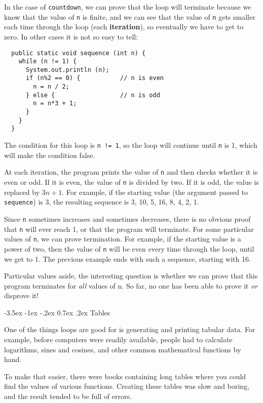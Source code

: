 \documentclass{book}
\makeatletter
\renewcommand{\section}{\@startsection 
    {section} {1} {0mm}%
    {-3.5ex \@plus -1ex \@minus -.2ex}%
    {0.7ex \@plus.2ex}%
    {\normalfont\Large\bfseries}}
\makeatother
\begin{document}
In the case of {\tt countdown}, we can prove that the loop
will terminate because we know that the value of {\tt n} is
finite, and we can see that the value of {\tt n} gets smaller
each time through the loop (each {\bf iteration}), so
eventually we have to get to zero.  In other cases it is not
so easy to tell:

\begin{verbatim}
  public static void sequence (int n) {
    while (n != 1) {
      System.out.println (n);
      if (n%2 == 0) {           // n is even
        n = n / 2;
      } else {                  // n is odd
        n = n*3 + 1;
      }
    }
  }
\end{verbatim}
%
The condition for this loop is {\tt n != 1}, so the loop
will continue until {\tt n} is 1, which will make the condition
false.

At each iteration, the program prints the value of {\tt n} and then
checks whether it is even or odd.  If it is even, the value of
{\tt n} is divided by two.  If it is odd, the value is replaced
by $3n+1$.  For example, if the starting value (the argument passed
to {\tt sequence}) is 3, the resulting sequence is
3, 10, 5, 16, 8, 4, 2, 1.

Since {\tt n} sometimes increases and sometimes decreases, there is no
obvious proof that {\tt n} will ever reach 1, or that the program will
terminate.  For some particular values of {\tt n}, we can prove
termination.  For example, if the starting value is a power of two, then
the value of {\tt n} will be even every time through the loop, until
we get to 1.  The previous example ends with such a sequence,
starting with 16.

Particular values aside, the interesting question is whether
we can prove that this program terminates for {\em all} values of n.
So far, no one has been able to prove it {\em or} disprove it!

\section{Tables}

One of the things loops are good for is generating and printing
tabular data.  For example, before computers were readily
available, people had to calculate logarithms,
sines and cosines, and other common mathematical functions
by hand.

To make that easier, there were books containing long tables
where you could find the values of various functions.
Creating these tables was slow and boring, and the result
tended to be full of errors.
\end{document}
